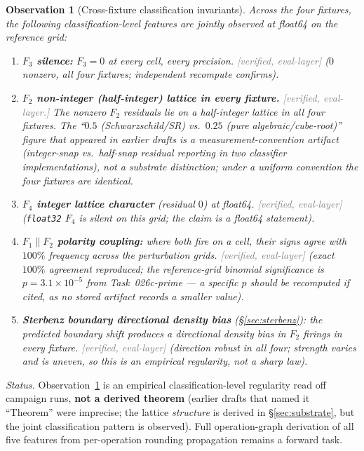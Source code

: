 \documentclass[11pt,a4paper]{article}
\newtheorem{observation}{Observation}
\newcommand{\status}[1]{\textcolor{gray}{\small\textsf{[#1]}}}
\begin{document}
\begin{observation}[Cross-fixture classification invariants]\label{obs:cross-fixture}
Across the four fixtures, the following classification-level features are jointly observed at float64 on the reference grid:
\begin{enumerate}
    \item \textbf{$F_3$ silence:} $F_3=0$ at every cell, every precision. \status{verified, eval-layer} ($0$ nonzero, all four fixtures; independent recompute confirms).
    \item \textbf{$F_2$ non-integer (half-integer) lattice in every fixture.} \status{verified, eval-layer.} The nonzero $F_2$ residuals lie on a half-integer lattice in all four fixtures. The ``$0.5$ (Schwarzschild/SR) vs.\ $0.25$ (pure algebraic/cube-root)'' figure that appeared in earlier drafts is a \emph{measurement-convention artifact} (integer-snap vs.\ half-snap residual reporting in two classifier implementations), not a substrate distinction; under a uniform convention the four fixtures are identical.
    \item \textbf{$F_4$ integer lattice character} (residual $0$) at float64. \status{verified, eval-layer} (\texttt{float32} $F_4$ is silent on this grid; the claim is a float64 statement).
    \item \textbf{$F_1\parallel F_2$ polarity coupling:} where both fire on a cell, their signs agree with $100\%$ frequency across the perturbation grids. \status{verified, eval-layer} (exact $100\%$ agreement reproduced; the reference-grid binomial significance is $p=3.1\times10^{-5}$ from Task~026c-prime --- a specific $p$ should be recomputed if cited, as no stored artifact records a smaller value).
    \item \textbf{Sterbenz boundary directional density bias} (\S\ref{sec:sterbenz}): the predicted boundary shift produces a directional density bias in $F_2$ firings in every fixture. \status{verified, eval-layer} (direction robust in all four; \emph{strength} varies and is uneven, so this is an empirical regularity, not a sharp law).
\end{enumerate}
\end{observation}

\noindent\emph{Status.} Observation~\ref{obs:cross-fixture} is an empirical classification-level regularity read off campaign runs, \textbf{not a derived theorem} (earlier drafts that named it ``Theorem'' were imprecise; the lattice \emph{structure} is derived in \S\ref{sec:substrate}, but the joint classification pattern is observed). Full operation-graph derivation of all five features from per-operation rounding propagation remains a forward task.
\end{document}
